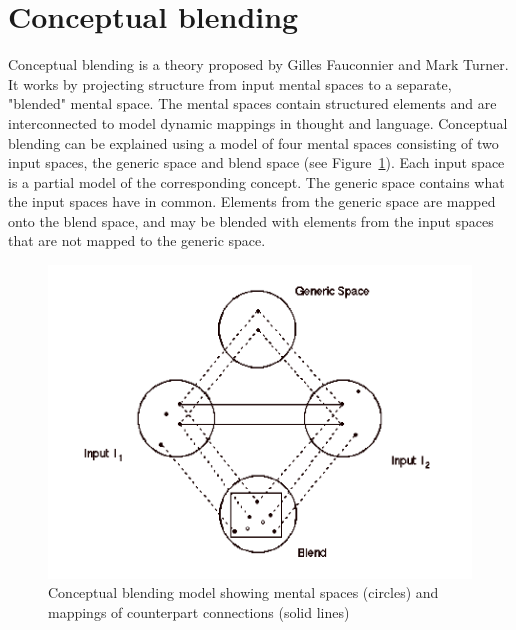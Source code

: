 



\section{Conceptual blending}
Conceptual blending is a theory proposed by Gilles Fauconnier and Mark Turner. It works by projecting structure from input mental spaces to a separate, "blended" mental space. \parencite{fauconnier1998conceptual}
The mental spaces contain structured elements and are interconnected to model dynamic mappings in thought and language.
Conceptual blending can be explained using a model of four mental spaces consisting of two input spaces, the generic space and blend space (see Figure~\ref{fig:concept-blending-firkant}).
Each input space is a partial model of the corresponding concept.
The generic space contains what the input spaces have in common.
Elements from the generic space are mapped onto the blend space, and may be blended with elements from the input spaces that are not mapped to the generic space.
\begin{figure}
\centering
\includegraphics[width=0.7\linewidth]{"Figures/concept blending firkant"}
\caption{Conceptual blending model showing mental spaces (circles) and mappings of counterpart connections (solid lines) \parencite{fauconnier1998conceptualfigure}}
\label{fig:concept-blending-firkant}
\end{figure}

